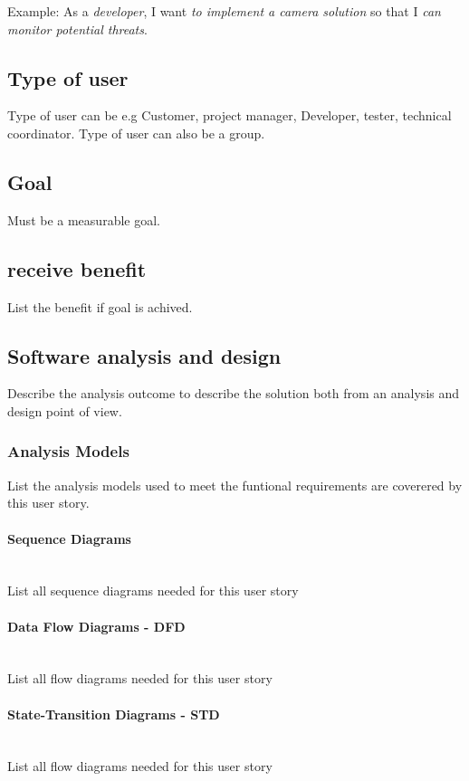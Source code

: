 \documentclass[a4paper]{article}
\begin{document}
	Example:
	As a \textit{developer}, I want \textit{to implement a camera solution} so that I \textit{can monitor potential threats}.

	\subsection{Type of user}
	Type of user can be e.g Customer, project manager, Developer, tester, technical coordinator.
	Type of user can also be a group.

	\subsection{Goal}
	Must be a measurable goal.

	\subsection{receive benefit}
	List the benefit if goal is achived.

		
	\subsection{Software analysis and design}
	Describe the analysis outcome to describe the solution both from an analysis and design point of view.
	 
	\subsubsection{Analysis Models}
	List the analysis models used to meet the funtional requirements are coverered by this user story.  
		
	\paragraph{Sequence Diagrams}\mbox{} \\
	List all sequence diagrams needed for this user story

	\paragraph{Data Flow Diagrams - DFD}\mbox{} \\
	List all flow diagrams needed for this user story

	\paragraph{State-Transition Diagrams - STD}\mbox{} \\
	List all flow diagrams needed for this user story
	
\end{document}
